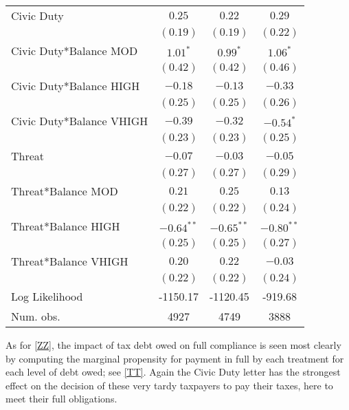 \documentclass[12pt,titlepage]{article}
\begin{document}
\begin{center}
\begin{longtable}{| l | c |  c| c|}
Civic Duty  & $0.25$        & $0.22$        & $0.29$        \\
                  & $(0.19)$      & $(0.19)$      & $(0.22)$      \\
Civic Duty*Balance MOD   & $1.01^{*}$    & $0.99^{*}$    & $1.06^{*}$    \\
                  & $(0.42)$      & $(0.42)$      & $(0.46)$      \\
Civic Duty*Balance HIGH   & $-0.18$       & $-0.13$       & $-0.33$       \\
                  & $(0.25)$      & $(0.25)$      & $(0.26)$      \\
Civic Duty*Balance VHIGH   & $-0.39$       & $-0.32$       & $-0.54^{*}$   \\
                  & $(0.23)$      & $(0.23)$      & $(0.25)$      \\
Threat            & $-0.07$       & $-0.03$       & $-0.05$       \\
                  & $(0.27)$      & $(0.27)$      & $(0.29)$      \\
Threat*Balance MOD & $0.21$        & $0.25$        & $0.13$        \\
                  & $(0.22)$      & $(0.22)$      & $(0.24)$      \\
Threat*Balance HIGH & $-0.64^{**}$  & $-0.65^{**}$  & $-0.80^{**}$  \\
                  & $(0.25)$      & $(0.25)$      & $(0.27)$      \\
Threat*Balance VHIGH & $0.20$        & $0.22$        & $-0.03$       \\
                  & $(0.22)$      & $(0.22)$      & $(0.24)$      \\
\hline
Log Likelihood    & -1150.17      & -1120.45      & -919.68       \\
Num. obs.         & 4927          & 4749          & 3888          \\
\end{longtable}
\end{center}


As for \ref{ZZ}, the impact of tax debt owed on full compliance is seen 
most clearly by computing the marginal propensity for payment in full 
by each treatment for each level of debt owed; see \ref{TT}.  
Again the Civic Duty letter has the strongest effect on the decision 
of these very tardy taxpayers to pay their taxes, here to meet their full obligations.  
\end{document}
